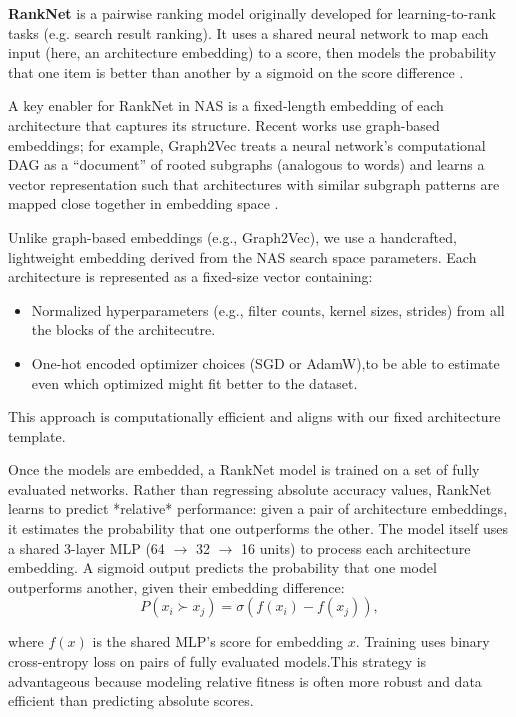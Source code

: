 \textbf{RankNet} is a pairwise ranking model originally developed for learning-to-rank tasks (e.g. search result ranking). It uses a shared neural network to map each input (here, an architecture embedding) to a score, then models the probability that one item is better than another by a sigmoid on the score difference \cite{RankNet}.

A key enabler for RankNet in NAS is a fixed-length embedding of each architecture that captures its structure. Recent works use graph-based embeddings; for example, Graph2Vec treats a neural network’s computational DAG as a “document” of rooted subgraphs (analogous to words) and learns a vector representation such that architectures with similar subgraph patterns are mapped close together in embedding space \cite{RankNet}.

Unlike graph-based embeddings (e.g., Graph2Vec), we use a handcrafted, lightweight embedding derived from the NAS search space parameters. Each architecture is represented as a fixed-size vector containing:
\begin{itemize}
    \item Normalized hyperparameters (e.g., filter counts, kernel sizes, strides) from all the blocks of the architecutre.
    \item One-hot encoded optimizer choices (SGD or AdamW),to be able to estimate even which optimized might fit better to the dataset.
\end{itemize}

This approach is computationally efficient and aligns with our fixed architecture template.

Once the models are embedded, a RankNet model is trained on a set of fully evaluated networks. Rather than regressing absolute accuracy values, RankNet learns to predict *relative* performance: given a pair of architecture embeddings, it estimates the probability that one outperforms the other. The model itself uses a shared 3-layer MLP (64 $\rightarrow$ 32 $\rightarrow$ 16 units) to process each architecture embedding. A sigmoid output predicts the probability that one model outperforms another, given their embedding difference:
\begin{equation}
    P(x_i \succ x_j) = \sigma(f(x_i) - f(x_j)),
\end{equation}

where $f(x)$ is the shared MLP's score for embedding $x$. Training uses binary cross-entropy loss on pairs of fully evaluated models.This strategy is advantageous because modeling relative fitness is often more robust
and data efficient than predicting absolute scores.


